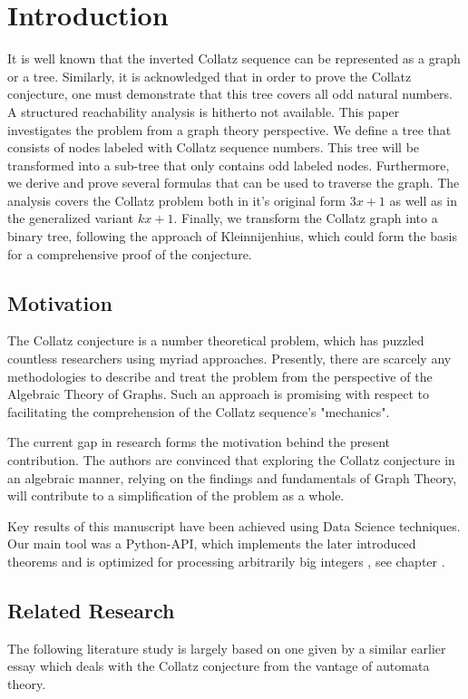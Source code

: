\chapter{Introduction}

\begin{summary}
It is well known that the inverted Collatz sequence can be represented as a graph or a tree. Similarly, it is acknowledged that in order to prove the Collatz conjecture, one must demonstrate that this tree covers all odd natural numbers. A structured reachability analysis is hitherto not available. This paper investigates the problem from a graph theory perspective. We define a tree that consists of nodes labeled with Collatz sequence numbers. This tree will be transformed into a sub-tree that only contains odd labeled nodes. Furthermore, we derive and prove several formulas that can be used to traverse the graph. The analysis covers the Collatz problem both in it's original form $3x+1$ as well as in the generalized variant $kx+1$. Finally, we transform the Collatz graph into a binary tree, following the approach of Kleinnijenhius, which could form the basis for a comprehensive proof of the conjecture.
\end{summary}

\section{Motivation}
The Collatz conjecture is a number theoretical problem, which has puzzled countless researchers using myriad approaches. Presently, there are scarcely any methodologies to describe and treat the problem from the perspective of the Algebraic Theory of Graphs. Such an approach is promising with respect to facilitating the comprehension of the Collatz sequence’s "mechanics".

The current gap in research forms the motivation behind the present contribution. The authors are convinced that exploring the Collatz conjecture in an algebraic manner, relying on the ﬁndings and fundamentals of Graph Theory, will contribute to a simplification of the problem as a whole.

Key results of this manuscript have been achieved using Data Science techniques. Our main tool was a Python-API, which implements the later introduced theorems and is optimized for processing arbitrarily big integers \cite{Ref_Koch_Github}, see chapter .

\section{Related Research}
The following literature study is largely based on one given by a similar earlier essay \cite{Ref_Sultanow_Volkov_Cox_2017} which deals with the Collatz conjecture from the vantage of automata theory.

